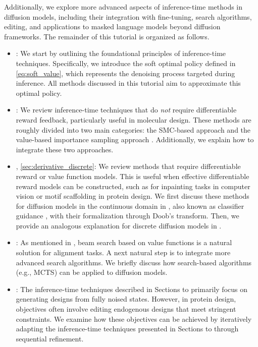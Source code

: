 \documentclass[12pt]{article} %
\begin{document}
{Additionally, we explore more advanced aspects of inference-time methods in diffusion models, including their integration with fine-tuning, search algorithms, editing, and applications to masked language models beyond diffusion frameworks. The remainder of this tutorial is organized as follows. 
\begin{itemize}
    \item {}: We start by outlining the foundational principles of inference-time techniques. Specifically, we introduce the soft optimal policy defined in \eqref{eq:soft_value}, which represents the denoising process targeted during inference. All methods discussed in this tutorial aim to approximate this optimal policy.
    \item {}: We review inference-time techniques that do \emph{not} require differentiable reward feedback, particularly useful in molecular design. These methods are roughly divided into two main categories: the SMC-based approach \citep{wu2024practical,dou2024diffusion,cardoso2023monte,phillips2024particle} and the value-based importance sampling approach \citep{li2024derivative}. 
    Additionally, we explain how to integrate these two approaches. 
    \item {}, \ref{sec:derivative_discrete}: We review methods that require differentiable reward or value function models. This is useful when effective differentiable reward models can be constructed, such as for inpainting tasks in computer vision or motif scaffolding in protein design. We first discuss these methods for diffusion models in the continuous domain in , also known as classifier guidance \citep{dhariwal2021diffusion,song2021score}, with their formalization through Doob's transform. Then, we provide an analogous explanation for discrete diffusion models in .
     \item {}: As mentioned in , beam search based on value functions is a natural solution for alignment tasks. A next natural step is to integrate more advanced search algorithms. We briefly discuss how search-based algorithms (e.g., MCTS) can be applied to diffusion models. 
      \item {}: {The inference-time techniques described in Sections  to  primarily focus on generating designs from fully noised states. However, in protein design, objectives often involve editing endogenous designs that meet stringent constraints. We examine how these objectives can be achieved by iteratively adapting the inference-time techniques presented in Sections  to  through sequential refinement. } 

\end{itemize}}
\end{document}
